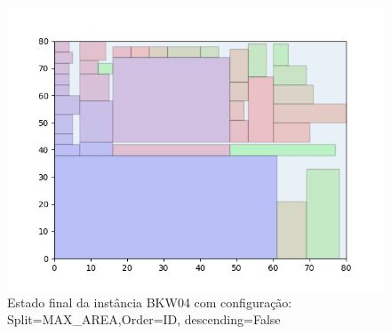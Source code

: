 \begin{figure}[H]
    \centering
    \caption[]{Estado final da instância BKW04 com configuração: Split=MAX_AREA,Order=ID, descending=False}
    \label{fig:bkw04-max_area-id-false}
    \includegraphics[scale=0.5]{output/figures/bkw/bkw04/max_area/id/false/00}
\end{figure}